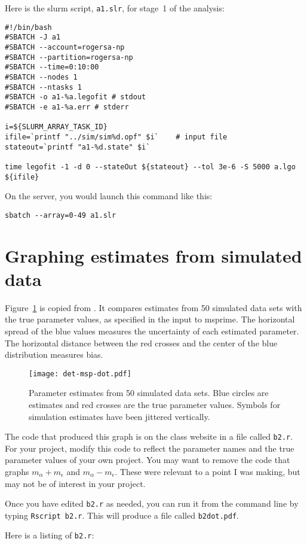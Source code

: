 \documentclass[11pt]{article}
\begin{document}
Here is the slurm script, \texttt{a1.slr}, for stage~1 of the analysis:
\begin{verbatim}
#!/bin/bash
#SBATCH -J a1
#SBATCH --account=rogersa-np
#SBATCH --partition=rogersa-np
#SBATCH --time=0:10:00
#SBATCH --nodes 1
#SBATCH --ntasks 1
#SBATCH -o a1-%a.legofit # stdout
#SBATCH -e a1-%a.err # stderr

i=${SLURM_ARRAY_TASK_ID}
ifile=`printf "../sim/sim%d.opf" $i`    # input file
stateout=`printf "a1-%d.state" $i`

time legofit -1 -d 0 --stateOut ${stateout} --tol 3e-6 -S 5000 a.lgo ${ifile}
\end{verbatim}
On the server, you would launch this command like this:
\begin{verbatim}
sbatch --array=0-49 a1.slr
\end{verbatim}

\section{Graphing estimates from simulated data}

Figure~\ref{fig.dot} is copied from \citet{Rogers:PCJ-2-e32}. It
compares estimates from 50 simulated data sets with the true parameter
values, as specified in the input to msprime. The horizontal spread of
the blue values measures the uncertainty of each estimated
parameter. The horizontal distance between the red crosses and the
center of the blue distribution measures bias.

\begin{figure}
  {\centering\texttt{[image: det-msp-dot.pdf]}\\}
  \caption{Parameter estimates from 50 simulated data sets. Blue
    circles are estimates and red crosses are the true parameter
    values. Symbols for simulation estimates have been jittered
    vertically.}
  \label{fig.dot}
\end{figure}

The code that produced this graph is on the class website in a file
called \texttt{b2.r}. For your project, modify this code to reflect
the parameter names and the true parameter values of your own
project. You may want to remove the code that graphs $m_\alpha +
m_\epsilon$ and $m_\alpha - m_\epsilon$. These were relevant to a
point I was making, but may not be of interest in your project.

Once you have edited \texttt{b2.r} as needed, you can run it from the
command line by typing \texttt{Rscript b2.r}. This will produce a file
called \texttt{b2dot.pdf}.

Here is a listing of \texttt{b2.r}:


\printbibliography
\end{document}
